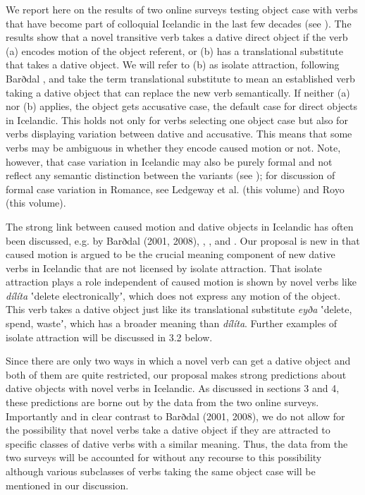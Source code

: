 We report here on the results of two online surveys testing object case with verbs that have become part of colloquial Icelandic in the last few decades (see \citealt{Thórarinsdóttir2015}). The results show that a novel transitive verb takes a dative direct object if the verb (a) encodes motion of the object referent, or (b) has a translational substitute that takes a dative object. We will refer to (b) as isolate attraction, following Barðdal , and take the term translational substitute to mean an established verb taking a dative object that can replace the new verb semantically. If neither (a) nor (b) applies, the object gets accusative case, the default case for direct objects in Icelandic. This holds not only for verbs selecting one object case but also for verbs displaying variation between dative and accusative. This means that some verbs may be ambiguous in whether they encode caused motion or not. Note, however, that case variation in Icelandic may also be purely formal and not reflect any semantic distinction between the variants (see \citealt{Jónsson2013b}); for discussion of formal case variation in Romance, see Ledgeway et al. (this volume) and Royo (this volume).

The strong link between caused motion and dative objects in Icelandic has often been discussed, e.g. by Barðdal (2001, 2008), \citet{Svenonius2002}, \citet{Maling2002}, and \citet{Jónsson2013a}. Our proposal is new in that caused motion is argued to be the crucial meaning component of new dative verbs in Icelandic that are not licensed by isolate attraction. That isolate attraction plays a role independent of caused motion is shown by novel verbs like \textit{dílíta} ʽdelete electronicallyʼ, which does not express any motion of the object. This verb takes a dative object just like its translational substitute \textit{eyða} ʽdelete, spend, wasteʼ, which has a broader meaning than \textit{dílíta}. Further examples of isolate attraction will be discussed in 3.2 below.

Since there are only two ways in which a novel verb can get a dative object and both of them are quite restricted, our proposal makes strong predictions about dative objects with novel verbs in Icelandic. As discussed in sections 3 and 4, these predictions are borne out by the data from the two online surveys. Importantly and in clear contrast to Barðdal (2001, 2008), we do not allow for the possibility that novel verbs take a dative object if they are attracted to specific classes of dative verbs with a similar meaning. Thus, the data from the two surveys will be accounted for without any recourse to this possibility although various subclasses of verbs taking the same object case will be mentioned in our discussion.


